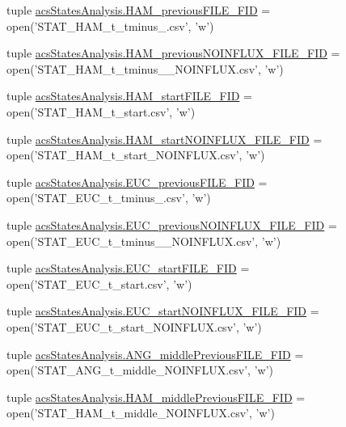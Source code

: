\begin{DoxyCompactItemize}
\item 
tuple \hyperlink{a00132_a3aad86d2cdbfb6f36b4b563b190d76c9}{acs\+States\+Analysis.\+H\+A\+M\+\_\+previous\+F\+I\+L\+E\+\_\+\+F\+I\+D} = open('S\+T\+A\+T\+\_\+\+H\+A\+M\+\_\+t\+\_\+tminus\+\_.\+csv', 'w')
\item 
tuple \hyperlink{a00132_a621d86851e86f9c83bb0add9ec741d7f}{acs\+States\+Analysis.\+H\+A\+M\+\_\+previous\+N\+O\+I\+N\+F\+L\+U\+X\+\_\+\+F\+I\+L\+E\+\_\+\+F\+I\+D} = open('S\+T\+A\+T\+\_\+\+H\+A\+M\+\_\+t\+\_\+tminus\+\_\+\_\+\+N\+O\+I\+N\+F\+L\+U\+X.\+csv', 'w')
\item 
tuple \hyperlink{a00132_abb14887e587e1107fc13046ad313077e}{acs\+States\+Analysis.\+H\+A\+M\+\_\+start\+F\+I\+L\+E\+\_\+\+F\+I\+D} = open('S\+T\+A\+T\+\_\+\+H\+A\+M\+\_\+t\+\_\+start.\+csv', 'w')
\item 
tuple \hyperlink{a00132_ab8a3b402c0b418cc290889a5f6482280}{acs\+States\+Analysis.\+H\+A\+M\+\_\+start\+N\+O\+I\+N\+F\+L\+U\+X\+\_\+\+F\+I\+L\+E\+\_\+\+F\+I\+D} = open('S\+T\+A\+T\+\_\+\+H\+A\+M\+\_\+t\+\_\+start\+\_\+\+N\+O\+I\+N\+F\+L\+U\+X.\+csv', 'w')
\item 
tuple \hyperlink{a00132_a3548edac9afffda077dcbd2876616b39}{acs\+States\+Analysis.\+E\+U\+C\+\_\+previous\+F\+I\+L\+E\+\_\+\+F\+I\+D} = open('S\+T\+A\+T\+\_\+\+E\+U\+C\+\_\+t\+\_\+tminus\+\_.\+csv', 'w')
\item 
tuple \hyperlink{a00132_aa2efc59329473a7bbeaf3ce32ec4dc3d}{acs\+States\+Analysis.\+E\+U\+C\+\_\+previous\+N\+O\+I\+N\+F\+L\+U\+X\+\_\+\+F\+I\+L\+E\+\_\+\+F\+I\+D} = open('S\+T\+A\+T\+\_\+\+E\+U\+C\+\_\+t\+\_\+tminus\+\_\+\_\+\+N\+O\+I\+N\+F\+L\+U\+X.\+csv', 'w')
\item 
tuple \hyperlink{a00132_a3d812ff298612e6aae54e7a9abfddbf2}{acs\+States\+Analysis.\+E\+U\+C\+\_\+start\+F\+I\+L\+E\+\_\+\+F\+I\+D} = open('S\+T\+A\+T\+\_\+\+E\+U\+C\+\_\+t\+\_\+start.\+csv', 'w')
\item 
tuple \hyperlink{a00132_a8ae5873fd9b162495a512e314047e930}{acs\+States\+Analysis.\+E\+U\+C\+\_\+start\+N\+O\+I\+N\+F\+L\+U\+X\+\_\+\+F\+I\+L\+E\+\_\+\+F\+I\+D} = open('S\+T\+A\+T\+\_\+\+E\+U\+C\+\_\+t\+\_\+start\+\_\+\+N\+O\+I\+N\+F\+L\+U\+X.\+csv', 'w')
\item 
tuple \hyperlink{a00132_aa5eb16eef2c90e2ccc991eb176280f21}{acs\+States\+Analysis.\+A\+N\+G\+\_\+middle\+Previous\+F\+I\+L\+E\+\_\+\+F\+I\+D} = open('S\+T\+A\+T\+\_\+\+A\+N\+G\+\_\+t\+\_\+middle\+\_\+\+N\+O\+I\+N\+F\+L\+U\+X.\+csv', 'w')
\item 
tuple \hyperlink{a00132_aaf0dd6e74d88a7cf2e909301b422c17d}{acs\+States\+Analysis.\+H\+A\+M\+\_\+middle\+Previous\+F\+I\+L\+E\+\_\+\+F\+I\+D} = open('S\+T\+A\+T\+\_\+\+H\+A\+M\+\_\+t\+\_\+middle\+\_\+\+N\+O\+I\+N\+F\+L\+U\+X.\+csv', 'w')

\end{DoxyCompactItemize}
